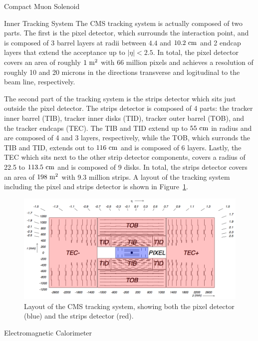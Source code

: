 \begin{section}{Compact Muon Solenoid}
\begin{subsection}{Inner Tracking System}
The CMS tracking system is actually composed of two parts.
The first is the pixel detector, which surrounds the interaction point, and is composed of 3 barrel layers at radii between $4.4$ and $10.2~\mathrm{cm}$ and 2 endcap layers that extend the acceptance up to $|\eta|<2.5$.
In total, the pixel detector covers an area of roughly $1~\mathrm{m}^2$ with 66 million pixels and achieves a resolution of roughly 10 and 20 microns in the directions transverse and logitudinal to the beam line, respectively.

The second part of the tracking system is the strips detector which sits just outside the pixel detector.
The strips detector is composed of 4 parts: the tracker inner barrel (TIB), tracker inner disks (TID), tracker outer barrel (TOB), and the tracker endcaps (TEC).
The TIB and TID extend up to $55~\mathrm{cm}$ in radius and are composed of 4 and 3 layers, respectively, while the TOB, which surronds the TIB and TID, extends out to $116~\mathrm{cm}$ and is composed of 6 layers.
Lastly, the TEC which sits next to the other strip detector components, covers a radius of 22.5 to $113.5~\mathrm{cm}$ and is composed of 9 disks.
In total, the strips detector covers an area of $198~\mathrm{m}^2$ with 9.3 million strips.
A layout of the tracking system including the pixel and strips detector is shown in Figure~\ref{fig:cms_tracker}.

\begin{figure}[tbp!]
\begin{center}
\includegraphics[angle=0,width=0.80\columnwidth]{fig/cms_tracker.png}
\end{center}
\caption{Layout of the CMS tracking system, showing both the pixel detector (blue) and the strips detector (red).~\cite{Lenzi:2013xpa}}
\label{fig:cms_tracker}
\end{figure}

\end{subsection}

\begin{subsection}{Electromagnetic Calorimeter}


\end{subsection}
\end{section}
